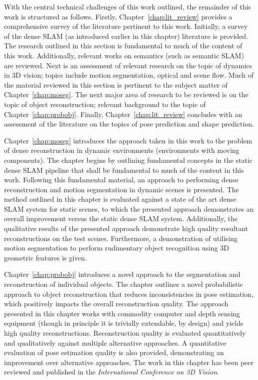 With the central technical challenges of this work outlined, the remainder of this work is structured 
as follows. Firstly, Chapter~\ref{chap:lit_review} provides a comprehensive survey of the literature 
pertinent to this work. Initially, a survey of the dense SLAM (as introduced earlier in this chapter) 
literature is provided. The research outlined in this section is fundamental to much of the content of 
this work. Additionally, relevant works on semantics (such as semantic SLAM) are reviewed. 
Next is an assessment of relevant research on the topic of dynamics in 3D vision; topics include motion 
segmentation, optical and scene flow. Much of the material reviewed in this section is pertinent to the 
subject matter of Chapter~\ref{chap:moseg}. The next major area of research to be reviewed is on the topic 
of object reconstruction; relevant background to the topic of Chapter~\ref{chap:probobj}. Finally, 
Chapter~\ref{chap:lit_review} concludes with an assessment of the literature on the topics of pose prediction 
and shape prediction.

Chapter~\ref{chap:moseg} introduces the approach taken in this work to the problem of dense reconstruction 
in dynamic environments (environments with moving components). The chapter begins by outlining fundamental 
concepts in the static dense SLAM pipeline that shall be fundamental to much of the content in this work. 
Following this fundamental material, an approach to performing dense reconstruction and motion segmentation 
in dynamic scenes is presented. The method outlined in this chapter is evaluated against a state of the art 
dense SLAM system for static scenes, to which the presented approach demonstrates an overall improvement 
versus the static dense SLAM system. Additionally, the qualitative results of the presented approach 
demonstrate high quality resultant reconstructions on the test scenes. Furthermore, a demonstration of 
utilising motion segmentation to perform rudimentary object recognition using 3D geometric features is 
given.

Chapter~\ref{chap:probobj} introduces a novel approach to the segmentation and reconstruction of individual 
objects. The chapter outlines a novel probabilistic approach to object reconstruction that reduces 
inconsistencies in pose estimation, which positively impacts the overall reconstruction quality. The 
approach presented in this chapter works with commodity computer and depth sensing equipment (though in 
principle it is trivially extendable, by design) and yields high quality reconstructions. Reconstruction 
quality is evaluated quantitatively and qualitatively against multiple alternative approaches. A 
quantitative evaluation of pose estimation quality is also provided, demonstrating an improvement over 
alternative approaches. The work in this chapter has been peer reviewed and published in the 
\textit{International Conference on 3D Vision}\footnotemark.

